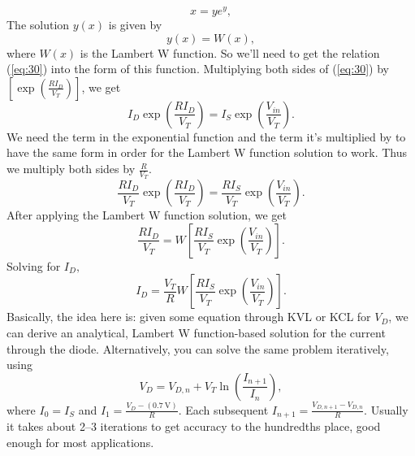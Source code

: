 \begin{equation}
\label{eq:31}
x = y e^{y},
\end{equation}
The solution $y(x)$ is given by
\begin{equation}
\label{eq:32}
y(x) = W(x),
\end{equation}
where $W(x)$ is the Lambert W function. So we'll need to get the relation (\ref{eq:30}) into the form of this function.
Multiplying both sides of (\ref{eq:30}) by $\left[ \exp \left( \frac{R I_{D}}{V_{T}} \right) \right]$, we get
\begin{equation}
\label{eq:33}
I_{D} \exp \left( \frac{R I_{D}}{V_{T}} \right) = I_{S} \exp \left( \frac{V_{in}}{V_{T}} \right).
\end{equation}
We need the term in the exponential function and the term it's multiplied by to have the same form in order for the Lambert W function solution to work. Thus we multiply both sides by $\frac{R}{V_{T}}$.
\begin{equation}
\label{eq:34}
\frac{R I_{D}}{V_{T}} \exp \left( \frac{R I_{D}}{V_{T}} \right) = \frac{R I_{S}}{V_{T}} \exp \left( \frac{V_{in}}{V_{T}} \right).
\end{equation}
After applying the Lambert W function solution, we get
\begin{equation}
\label{eq:35}
\frac{R I_{D}}{V_{T}} = W \left[ \frac{R I_{S}}{V_{T}} \exp \left( \frac{V_{in}}{V_{T}} \right) \right].
\end{equation}
Solving for $I_{D},$
\begin{equation}
\label{eq:36}
I_{D} = \frac{V_{T}}{R} W \left[ \frac{R I_{S}}{V_{T}} \exp \left( \frac{V_{in}}{V_{T}} \right) \right].
\end{equation}
Basically, the idea here is: given some equation through KVL or KCL for $V_{D}$, we can derive an analytical, Lambert W function-based solution for the current through the diode. Alternatively, you can solve the same problem iteratively, using
\begin{equation}
\label{eq:37}
V_{D} = V_{D,n} + V_{T} \ln \left( \frac{I_{n+1}}{I_{n}} \right),
\end{equation}
where $I_{0} = I_{S}$ and $I_{1} = \frac{ V_{D} - \left( \SI{0.7}{\volt} \right) }{R}$. Each subsequent $I_{n+1} = \frac{ V_{D,n+1} - V_{D,n} }{R}$. Usually it takes about 2--3 iterations to get accuracy to the hundredths place, good enough for most applications.
